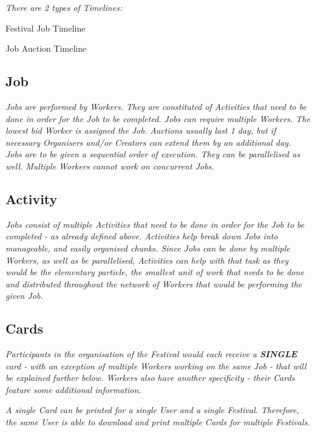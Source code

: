 		\bigbreak
		\textit{There are 2 types of Timelines:}
		\begin{packed_item}
			\item Festival Job Timeline
			\item Job Auction Timeline	
		\end{packed_item}
	
		\subsection{Job}
		\textit{Jobs are performed by Workers. They are constituted of Activities that need to be done in order for the Job to be completed. Jobs can require multiple Workers. The lowest bid Worker is assigned the Job. Auctions usually last 1 day, but if necessary Organisers and/or Creators can extend them by an additional day.}\\
		
		\textit{Jobs are to be given a sequential order of execution. They can be parallelised as well. Multiple Workers cannot work on concurrent Jobs.}
		
		\subsection{Activity}
		\textit{Jobs consist of multiple Activities that need to be done in order for the Job to be completed - as already defined above. Activities help break down Jobs into manageable, and easily organised chunks. Since Jobs can be done by multiple Workers, as well as be parallelised, Activities can help with that task as they would be the elementary particle, the smallest unit of work that needs to be done and distributed throughout the network of Workers that would be performing the given Job.}
		
		\subsection{Cards}
		\textit{Participants in the organisation of the Festival would each receive a \textbf{SINGLE} card - with an exception of multiple Workers working on the same Job - that will be explained further below. Workers also have another specificity - their Cards feature some additional information.}
		
		\textit{A single Card can be printed for a single User and a single Festival. Therefore, the same User is able to download and print multiple Cards for multiple Festivals.}
	
